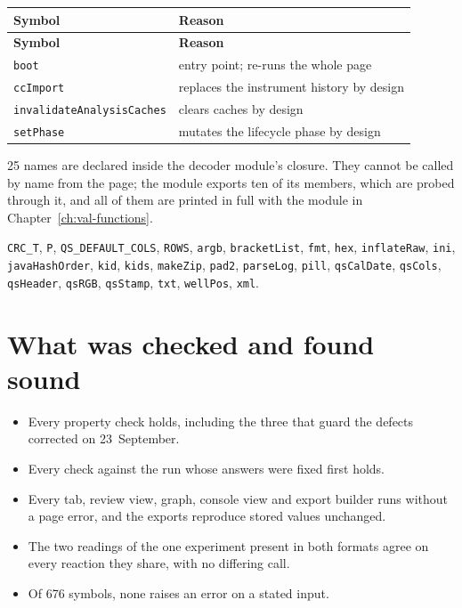 {\small
\begin{xltabular}{\linewidth}{|X|l|}
\toprule \textbf{Symbol} & \textbf{Reason} \\\midrule\endfirsthead
\toprule \textbf{Symbol} & \textbf{Reason} \\\midrule\endhead
\texttt{boot} & entry point; re-runs the whole page \\
\texttt{ccImport} & replaces the instrument history by design \\
\texttt{invalidateAnalysisCaches} & clears caches by design \\
\texttt{setPhase} & mutates the lifecycle phase by design \\
\bottomrule
\end{xltabular}}


25 names are declared inside the decoder module's closure. They cannot be called by
name from the page; the module exports ten of its members, which are probed through
it, and all of them are printed in full with the module in
Chapter~\ref{ch:val-functions}.

\par{\small \texttt{CRC\_T}, \texttt{P}, \texttt{QS\_DEFAULT\_COLS}, \texttt{ROWS}, \texttt{argb}, \texttt{bracketList}, \texttt{fmt}, \texttt{hex}, \texttt{inflateRaw}, \texttt{ini}, \texttt{javaHashOrder}, \texttt{kid}, \texttt{kids}, \texttt{makeZip}, \texttt{pad2}, \texttt{parseLog}, \texttt{pill}, \texttt{qsCalDate}, \texttt{qsCols}, \texttt{qsHeader}, \texttt{qsRGB}, \texttt{qsStamp}, \texttt{txt}, \texttt{wellPos}, \texttt{xml}.}\par


\section{What was checked and found sound}
\begin{itemize}
\item Every property check holds, including the three that guard the defects
  corrected on 23~September.
\item Every check against the run whose answers were fixed first holds.
\item Every tab, review view, graph, console view and export builder runs without a
  page error, and the exports reproduce stored values unchanged.
\item The two readings of the one experiment present in both formats agree on every
  reaction they share, with no differing call.
\item Of 676 symbols, none raises an error on a stated input.
\end{itemize}

